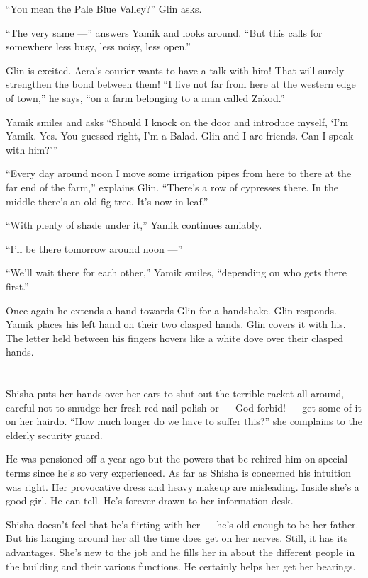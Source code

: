 \documentclass[twoside,11pt,openany]{book}
\begin{document}
``You mean the Pale Blue Valley?'' Glin asks.

``The very same ---'' answers Yamik and looks around. ``But this calls for
somewhere less busy, less noisy, less open.''

Glin is excited.  Aera's courier wants to have a talk with him! That will surely strengthen the bond between them!
``I live not far from here at the western edge of town,'' he says, ``on a farm
belonging to a man called Zakod.''

Yamik smiles and asks ``Should I knock on the door and introduce myself, `I'm Yamik. Yes. You guessed
right, I'm a Balad. Glin and I are friends. Can I speak with him?{}'\thinspace''

``Every day around noon I move some irrigation pipes from here to there at the far end of the farm,''
explains Glin. ``There's a row of cypresses there.  In the middle there's an old fig tree. It's now in
leaf.''

``With plenty of shade under it,'' Yamik continues amiably.

``I'll be there tomorrow around noon ---''

``We'll wait there for each other,'' Yamik smiles, ``depending on who gets there
first.''

Once again he extends a hand towards Glin for a handshake. Glin responds. Yamik places his left hand on their two
clasped hands. Glin covers it with his. The letter held between his fingers hovers like a white dove over their clasped
hands.


\bigskip

\chapter{}

Shisha puts her hands over her ears to shut out the terrible racket all around, careful not to smudge her fresh red nail
polish or --- God forbid! --- get some of it on her hairdo. ``How much longer do we have to suffer
this?'' she complains to the elderly security guard.

He was pensioned off a year ago but the powers that be rehired him on special terms since he's so very experienced. As
far as Shisha is concerned his intuition was right. Her provocative dress and heavy makeup are misleading. Inside she's
a good girl. He can tell. He's forever drawn to her information desk.

Shisha doesn't feel that he's flirting with her ---  he's old enough to be her father. But his hanging around her all
the time does get on her nerves. Still, it has its advantages. She's new to the job and he fills her in about the
different people in the building and their various functions. He certainly helps her get her bearings.
\end{document}
